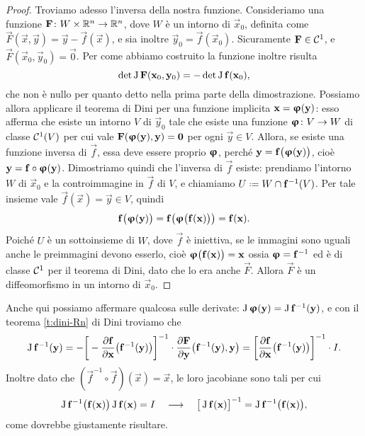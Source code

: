 \begin{proof}
	Troviamo adesso l'inversa della nostra funzione.
	Consideriamo una funzione $\mathbf{F}\colon W\times\mathbb{R}^n\to\mathbb{R}^n$, dove $W$ è un intorno di $\vec x_0$, definita come $\vec F(\vec x,\vec y)=\vec y-\vec f(\vec x)$, e sia inoltre $\vec y_0=\vec f(\vec x_0)$.
	Sicuramente $\mathbf{F}\in\mathcal{C}^{{1}}$, e $\vec F(\vec x_0,\vec y_0)=\vec 0$.
	Per come abbiamo costruito la funzione inoltre risulta
	\begin{equation}
		\det\operatorname{J}\mathbf{F}(\mathbf{x}_0,\mathbf{y}_0)=-\det\operatorname{J}\mathbf{f}(\mathbf{x}_0),
	\end{equation}
	che non è nullo per quanto detto nella prima parte della dimostrazione.
	Possiamo allora applicare il teorema di Dini per una funzione implicita $\mathbf{x}=\bm{\upvarphi}(\mathbf{y})$: esso afferma che esiste un intorno $V$ di $\vec y_0$ tale che esiste una funzione $\bm{\upvarphi}\colon V\to W$ di classe $\mathcal{C}^{{1}}(V)$ per cui vale $\mathbf{F}(\bm{\upvarphi}(\mathbf{y}),\mathbf{y})=\mathbf{0}$ per ogni $\vec y\in V$.
	Allora, se esiste una funzione inversa di $\vec f$, essa deve essere proprio $\bm{\upvarphi}$, perch\'e $\mathbf{y}=\mathbf{f}\big(\bm{\upvarphi}(\mathbf{y})\big)$, cioè $\mathbf{y}=\mathbf{f}\circ \bm{\upvarphi}(\mathbf{y})$.
	Dimostriamo quindi che l'inversa di $\vec f$ esiste: prendiamo l'intorno $W$ di $\vec x_0$ e la controimmagine in $\vec f$ di $V$, e chiamiamo $U\defeq W\cap\vec f^{-1}(V)$.
	Per tale insieme vale $\vec f(\vec x)=\vec y\in V$, quindi
	\begin{equation*}
		\mathbf{f}\big(\bm{\upvarphi}(\mathbf{y})\big)=\mathbf{f}\big(\bm{\upvarphi}\big(\mathbf{f}(\mathbf{x})\big)\big)=\mathbf{f}(\mathbf{x}).
	\end{equation*}
	Poiché $U$ è un sottoinsieme di $W$, dove $\vec f$ è iniettiva, se le immagini sono uguali anche le preimmagini devono esserlo, cioè $\bm{\upvarphi}\big(\mathbf{f}(\mathbf{x})\big)=\mathbf{x}$ ossia $\bm{\upvarphi}=\mathbf{f}^{-1}$ ed è di classe $\mathcal{C}^{{1}}$ per il teorema di Dini, dato che lo era anche $\vec F$.
	Allora $\vec F$ è un diffeomorfismo in un intorno di $\vec x_0$.
\end{proof}
Anche qui possiamo affermare qualcosa sulle derivate: $\operatorname{J}\bm{\upvarphi}(\mathbf{y})=\operatorname{J}\mathbf{f}^{-1}(\mathbf{y})$, e con il teorema \ref{t:dini-Rn} di Dini troviamo che
\begin{equation}
	\operatorname{J}\mathbf{f}^{-1}(\mathbf{y})=-\bigg[-\frac{\partial {\mathbf{f}}}{\partial {\mathbf{x}}}\big(\mathbf{f}^{-1}(\mathbf{y})\big)\bigg]^{-1}\cdot\frac{\partial {\mathbf{F}}}{\partial {\mathbf{y}}}\big(\mathbf{f}^{-1}(\mathbf{y}),\mathbf{y}\big)
	=\bigg[\frac{\partial {\mathbf{f}}}{\partial {\mathbf{x}}}\big(\mathbf{f}^{-1}(\mathbf{y})\big)\bigg]^{-1}\cdot I.
\end{equation}
Inoltre dato che $(\vec f^{-1}\circ\vec f)(\vec x)=\vec x$, le loro jacobiane sono tali per cui
\begin{equation*}
	\operatorname{J}\mathbf{f}^{-1}\big(\mathbf{f}(\mathbf{x})\big)\operatorname{J}\mathbf{f}(\mathbf{x})=I\quad\longrightarrow\quad \big[\operatorname{J}\mathbf{f}(\mathbf{x})\big]^{-1}=\operatorname{J}\mathbf{f}^{-1}\big(\mathbf{f}(\mathbf{x})\big),
\end{equation*}
come dovrebbe giustamente risultare.

